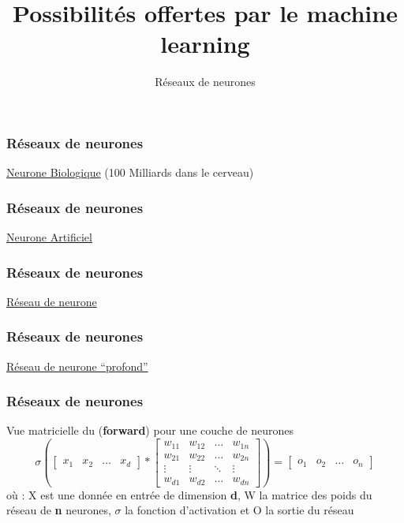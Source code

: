 \documentclass{formation}
\title{Possibilités offertes par le machine learning}
\subtitle{Réseaux de neurones}
\begin{document}
\maketitle

\begin{frame}
  \frametitle{Réseaux de neurones}
  \begin{center}
    \underline{Neurone Biologique} (100 Milliards dans le cerveau)
  \end{center}
\end{frame}

\begin{frame}
  \frametitle{Réseaux de neurones}
  \begin{center}
    \underline{Neurone Artificiel}
  \end{center}
\end{frame}

\begin{frame}
  \frametitle{Réseaux de neurones}
  \begin{center}
    \underline{Réseau de neurone}
  \end{center}
\end{frame}

\begin{frame}
  \frametitle{Réseaux de neurones}
  \begin{center}
    \underline{Réseau de neurone ``profond''}
  \end{center}
\end{frame}

\begin{frame}
  \frametitle{Réseaux de neurones}
  Vue matricielle du (\textbf{forward}) pour une couche de neurones
  \[
  \sigma \left(
  \begin{bmatrix}
    x_{1} & x_{2} & \dots & x_{d}
  \end{bmatrix}
  *
  \begin{bmatrix}
    w_{11} & w_{12} & \dots  & w_{1n} \\
    w_{21} & w_{22} & \dots  & w_{2n} \\
    \vdots & \vdots & \ddots & \vdots \\
    w_{d1} & w_{d2} & \dots  & w_{dn}
  \end{bmatrix}
  \right )
  =
  \begin{bmatrix}
    o_{1} & o_{2} & \dots & o_{n}
  \end{bmatrix}
  \]
  \newline
  où :
  \newline
  X est une donnée en entrée de dimension \textbf{d},
  \newline
  W la matrice des poids du réseau de  \textbf{n} neurones,
  \newline
  $\sigma$ la fonction d'activation et
  \newline
  O la sortie du réseau
\end{frame}
\end{document}
